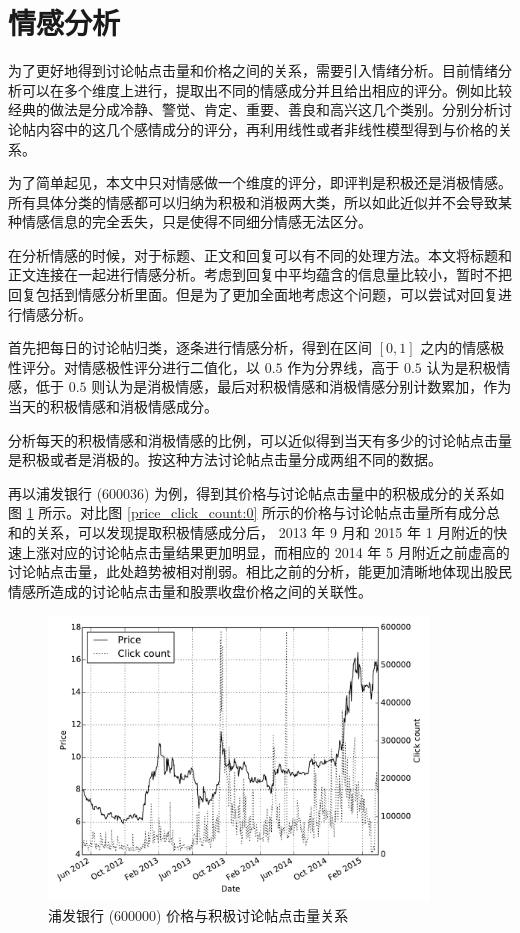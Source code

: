 \section{情感分析}

为了更好地得到讨论帖点击量和价格之间的关系，需要引入情绪分析。目前情绪分析可以在多个维度上进行，提取出不同的情感成分并且给出相应的评分。例如比较经典的做法是分成冷静、警觉、肯定、重要、善良和高兴这几个类别。分别分析讨论帖内容中的这几个感情成分的评分，再利用线性或者非线性模型得到与价格的关系。

为了简单起见，本文中只对情感做一个维度的评分，即评判是积极还是消极情感。所有具体分类的情感都可以归纳为积极和消极两大类，所以如此近似并不会导致某种情感信息的完全丢失，只是使得不同细分情感无法区分。

在分析情感的时候，对于标题、正文和回复可以有不同的处理方法。本文将标题和正文连接在一起进行情感分析。考虑到回复中平均蕴含的信息量比较小，暂时不把回复包括到情感分析里面。但是为了更加全面地考虑这个问题，可以尝试对回复进行情感分析。

首先把每日的讨论帖归类，逐条进行情感分析，得到在区间 $[0,1]$ 之内的情感极性评分。对情感极性评分进行二值化，以 $0.5$ 作为分界线，高于 $0.5$ 认为是积极情感，低于 $0.5$ 则认为是消极情感，最后对积极情感和消极情感分别计数累加，作为当天的积极情感和消极情感成分。

分析每天的积极情感和消极情感的比例，可以近似得到当天有多少的讨论帖点击量是积极或者是消极的。按这种方法讨论帖点击量分成两组不同的数据。

再以浦发银行 (600036) 为例，得到其价格与讨论帖点击量中的积极成分的关系如图 \ref{price_click_count:7} 所示。对比图 \ref{price_click_count:0} 所示的价格与讨论帖点击量所有成分总和的关系，可以发现提取积极情感成分后， 2013 年 9 月和 2015 年 1 月附近的快速上涨对应的讨论帖点击量结果更加明显，而相应的 2014 年 5 月附近之前虚高的讨论帖点击量，此处趋势被相对削弱。相比之前的分析，能更加清晰地体现出股民情感所造成的讨论帖点击量和股票收盘价格之间的关联性。

\begin{figure}
  \centering
  \includegraphics[width=0.9\textwidth]{plots/price_click_count_positive_line.pdf}
  \caption{浦发银行 (600000) 价格与积极讨论帖点击量关系}
  \label{price_click_count:7}
\end{figure}

